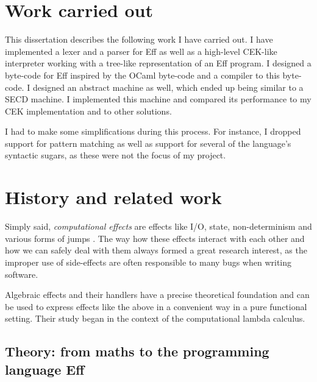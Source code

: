 \documentclass[class=article,crop=false,11pt]{standalone}
\begin{document}
\section{Work carried out}

This dissertation describes the following work I have carried out. I have implemented
a lexer and a parser for Eff as well as a high-level CEK-like interpreter working with
a tree-like representation of an Eff program. I designed a byte-code for Eff inspired
by the OCaml byte-code and a compiler to this byte-code. I designed an abstract machine
as well, which ended up being similar to a SECD machine. I implemented this machine and
compared its performance to my CEK implementation and to other solutions.

I had to make some simplifications during this process.
For instance, I dropped support for pattern matching as well as support for
several of the language's syntactic sugars, as these were not the focus of my project.

\section{History and related work}

Simply said, \emph{computational effects} are effects like I/O, state, non-determinism
and  various forms of jumps \cite{plotkin2002computational}. The way how these
effects interact with each other and how we can safely deal with them always formed a
great research interest, as the improper use of side-effects are often responsible to
many bugs when writing software.


Algebraic effects and their handlers have a precise theoretical foundation and can be
used to express effects like the above in a convenient way in a pure functional setting.
Their study began in the context of the computational lambda calculus.

\subsection{Theory: from maths to the programming language Eff}

\end{document}
